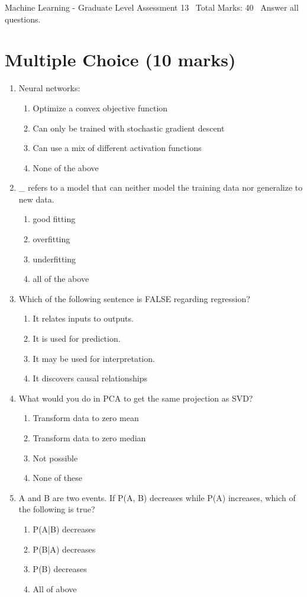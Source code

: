\documentclass[12pt]{article}
\begin{document}
\begin{center}
Machine Learning - Graduate Level Assessment 13 \
Total Marks: 40 \
Answer all questions.
\end{center}

\section*{Multiple Choice (10 marks)}
\begin{enumerate}[label=\arabic*.]
\item Neural networks:
\begin{enumerate}[label=(\alph*)]
    \item Optimize a convex objective function
    \item Can only be trained with stochastic gradient descent
    \item Can use a mix of different activation functions
    \item None of the above
\end{enumerate}
\item \_ refers to a model that can neither model the training data nor generalize to new data.
\begin{enumerate}[label=(\alph*)]
    \item good fitting
    \item overfitting
    \item underfitting
    \item all of the above
\end{enumerate}
\item Which of the following sentence is FALSE regarding regression?
\begin{enumerate}[label=(\alph*)]
    \item It relates inputs to outputs.
    \item It is used for prediction.
    \item It may be used for interpretation.
    \item It discovers causal relationships
\end{enumerate}
\item What would you do in PCA to get the same projection as SVD?
\begin{enumerate}[label=(\alph*)]
    \item Transform data to zero mean
    \item Transform data to zero median
    \item Not possible
    \item None of these
\end{enumerate}
\item A and B are two events. If P(A, B) decreases while P(A) increases, which of the following is true?
\begin{enumerate}[label=(\alph*)]
    \item P(A|B) decreases
    \item P(B|A) decreases
    \item P(B) decreases
    \item All of above
\end{enumerate}
\end{enumerate}
\end{document}
